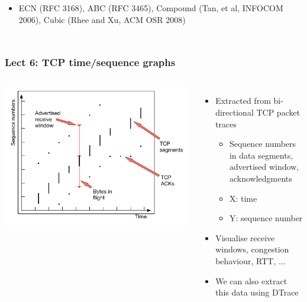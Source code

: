 \begin{frame}
\begin{columns}[T]
\begin{itemize}
        \item ECN (RFC 3168), ABC (RFC 3465), Compound (Tan, et al, INFOCOM
	  2006), Cubic (Rhee and Xu, ACM OSR 2008)
      \end{itemize}
  \end{columns}
\end{frame}

\begin{frame}
  \frametitle{Lect 6: TCP time/sequence graphs}

  \begin{columns}[T]
      \bigskip
      \includegraphics[width=1.25\textwidth]{../../figures/tcp-time-sequence.pdf}

    \begin{itemize}
      \item Extracted from bi-directional TCP packet traces
      \begin{itemize}
	\item Sequence numbers in data segments, advertised window,
	  acknowledgments
	\item X: time
	\item Y: sequence number
      \end{itemize}
      \item Visualise receive windows, congestion behaviour, RTT, ...
      \item We can also extract this data using DTrace
    \end{itemize}
  \end{columns}
\end{frame}

